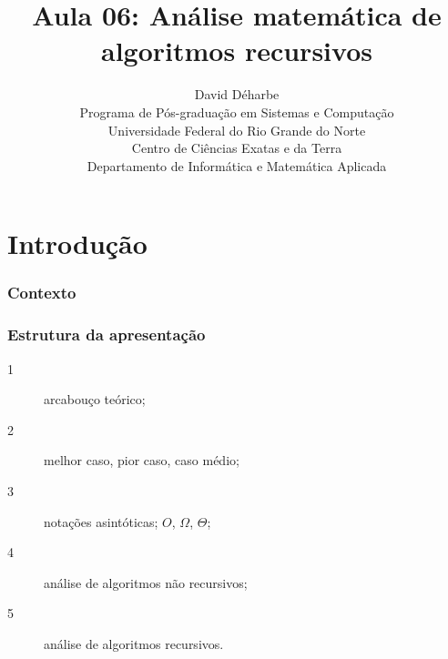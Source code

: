 \documentclass[handout]{beamer}
\title{Aula 06: Análise matemática de algoritmos recursivos}
\author{David Déharbe \\
  Programa de Pós-graduação em Sistemas e Computação \\
  Universidade Federal do Rio Grande do Norte \\
  Centro de Ciências Exatas e da Terra \\
  Departamento de Informática e Matemática Aplicada}
\date{}
\begin{document}
\begin{frame}
  \titlepage
\end{frame}

\section{Introdução}

\begin{frame}

  \frametitle{Contexto}

  \begin{center}
  
  \end{center}
\end{frame}


\begin{frame}

  \frametitle{Estrutura da apresentação}

  \begin{description}
  \item[1] arcabouço teórico;
  \item[2] melhor caso, pior caso, caso médio;
  \item[3] notações asintóticas; $O$, $\Omega$, $\Theta$;
  \item[4] análise de algoritmos não recursivos;
  \item[5] \alert{análise de algoritmos recursivos}.
  \end{description}
\end{frame}
\end{document}
